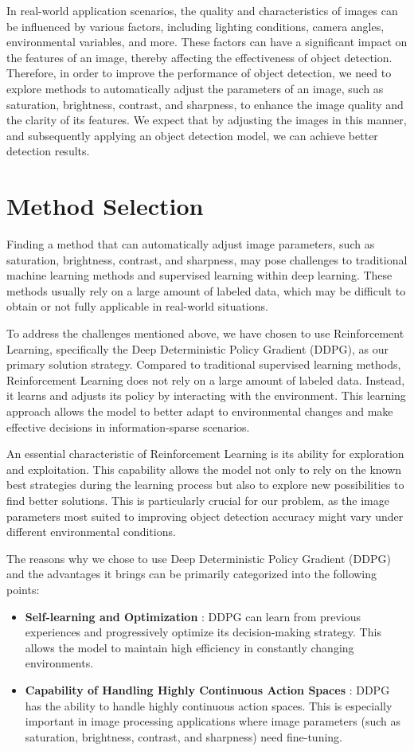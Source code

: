 \documentclass{PHlab-thesis}
\begin{document}
In real-world application scenarios, the quality and characteristics of images can be influenced by various factors, including lighting conditions, camera angles, environmental variables, and more. These factors can have a significant impact on the features of an image, thereby affecting the effectiveness of object detection. Therefore, in order to improve the performance of object detection, we need to explore methods to automatically adjust the parameters of an image, such as saturation, brightness, contrast, and sharpness, to enhance the image quality and the clarity of its features. We expect that by adjusting the images in this manner, and subsequently applying an object detection model, we can achieve better detection results.

\section{Method Selection}
Finding a method that can automatically adjust image parameters, such as saturation, brightness, contrast, and sharpness, may pose challenges to traditional machine learning methods and supervised learning within deep learning. These methods usually rely on a large amount of labeled data, which may be difficult to obtain or not fully applicable in real-world situations.

To address the challenges mentioned above, we have chosen to use Reinforcement Learning, specifically the Deep Deterministic Policy Gradient (DDPG), as our primary solution strategy. Compared to traditional supervised learning methods, Reinforcement Learning does not rely on a large amount of labeled data. Instead, it learns and adjusts its policy by interacting with the environment. This learning approach allows the model to better adapt to environmental changes and make effective decisions in information-sparse scenarios.

An essential characteristic of Reinforcement Learning is its ability for exploration and exploitation. This capability allows the model not only to rely on the known best strategies during the learning process but also to explore new possibilities to find better solutions. This is particularly crucial for our problem, as the image parameters most suited to improving object detection accuracy might vary under different environmental conditions.

The reasons why we chose to use Deep Deterministic Policy Gradient (DDPG) and the advantages it brings can be primarily categorized into the following points:
\begin{itemize}
    \item \textbf{Self-learning and Optimization} : DDPG can learn from previous experiences and progressively optimize its decision-making strategy. This allows the model to maintain high efficiency in constantly changing environments.
    \item \textbf{Capability of Handling Highly Continuous Action Spaces} : DDPG has the ability to handle highly continuous action spaces. This is especially important in image processing applications where image parameters (such as saturation, brightness, contrast, and sharpness) need fine-tuning.
\end{itemize}
\end{document}
